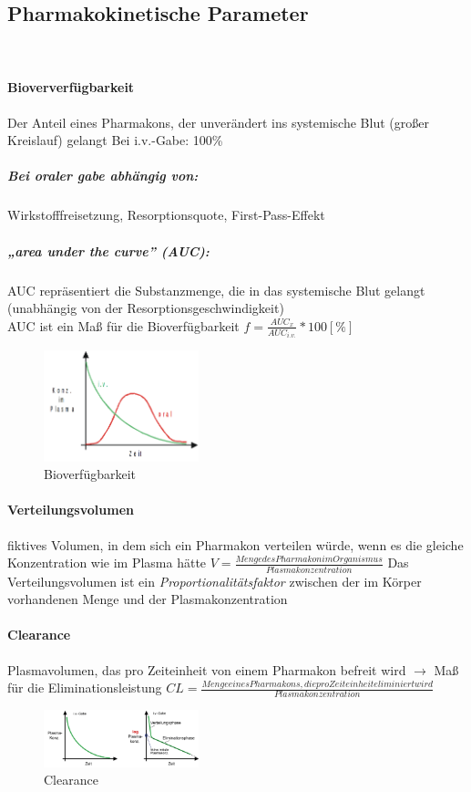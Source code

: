 \documentclass[10pt,a4paper]{report}
\begin{document}
\subsection{Pharmakokinetische Parameter} \mbox{} \\
\paragraph{Bioververfügbarkeit}
Der Anteil eines Pharmakons, der unverändert ins systemische Blut (großer Kreislauf) gelangt
Bei i.v.-Gabe: 100\%\\
\subparagraph{Bei oraler gabe abhängig von:} Wirkstofffreisetzung,	Resorptionsquote, First-Pass-Effekt\\
\subparagraph{„area under the curve” (AUC):}
AUC repräsentiert die Substanzmenge, 
die in das systemische Blut gelangt 
(unabhängig von der Resorptionsgeschwindigkeit)\\
AUC ist ein Maß für die Bioverfügbarkeit  $f=\frac{AUC_x}{AUC_{i.v.}}*100[\%]$
\begin{figure}[h]
	\centering 
	\includegraphics[width=0.4\textwidth]{konzentrationzeit.png} 
	\caption{Bioverfügbarkeit} 
	\label{fig:Bioverfuegbarkeit}
\end{figure}
\paragraph{Verteilungsvolumen}
 fiktives Volumen, in dem sich ein Pharmakon verteilen würde, wenn es die gleiche Konzentration wie im Plasma hätte $V=\frac{Menge des Pharmakon im Organismus}{Plasmakonzentration}$ Das Verteilungsvolumen ist ein \textit{Proportionalitätsfaktor} zwischen der im Körper vorhandenen Menge und der Plasmakonzentration
 \paragraph{Clearance}
 Plasmavolumen, das pro Zeiteinheit von einem Pharmakon befreit wird  $\rightarrow$ Maß für die Eliminationsleistung $CL=\frac{Menge eines Pharmakons, die pro Zeiteinheit eliminiert wird}{Plasmakonzentration}$
\begin{figure}[h]
	\centering 
	\includegraphics[width=0.4\textwidth]{clearance.png} 
	\caption{Clearance} 
	\label{fig:Clearance}
\end{figure}
\end{document}
